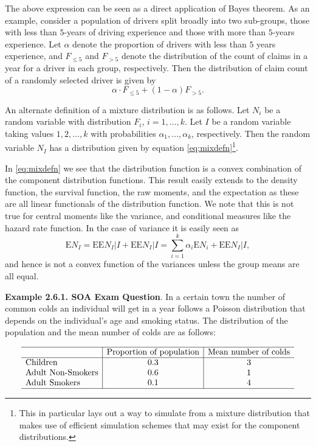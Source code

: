 \documentclass[]{book}
\let\rmarkdownfootnote\footnote%
\def\footnote{\protect\rmarkdownfootnote}
\theoremstyle{definition}
\theoremstyle{definition}
\theoremstyle{definition}
\theoremstyle{remark}
\begin{document}
The above expression can be seen as a direct application of Bayes
theorem. As an example, consider a population of drivers split broadly
into two sub-groups, those with less than \(5\)-years of driving
experience and those with more than \(5\)-years experience. Let
\(\alpha\) denote the proportion of drivers with less than \(5\) years
experience, and \(F_{\leq 5}\) and \(F_{> 5}\) denote the distribution
of the count of claims in a year for a driver in each group,
respectively. Then the distribution of claim count of a randomly
selected driver is given by \[
\alpha\cdot F_{\leq 5} + (1-\alpha)F_{> 5}.
\]

An alternate definition of a mixture distribution is as follows. Let
\(N_i\) be a random variable with distribution \(F_i\),
\(i=1,\ldots, k\). Let \(I\) be a random variable taking values
\(1,2,\ldots,k\) with probabilities \(\alpha_1,\ldots,\alpha_k\),
respectively. Then the random variable \(N_I\) has a distribution given
by equation \eqref{eq:mixdefn}\footnote{This in particular lays out a way
  to simulate from a mixture distribution that makes use of efficient
  simulation schemes that may exist for the component distributions.}.

In \eqref{eq:mixdefn} we see that the distribution function is a convex
combination of the component distribution functions. This result easily
extends to the density function, the survival function, the raw moments,
and the expectation as these are all linear functionals of the
distribution function. We note that this is not true for central moments
like the variance, and conditional measures like the hazard rate
function. In the case of variance it is easily seen as \[
\mathrm{E}{N_I}=\mathrm{E}{\mathrm{E}{N_I\vert I}} + \mathrm{E}{\mathrm{E}{N_I|I}}=\sum_{i=1}^k \alpha_i \mathrm{E}{N_i} + \mathrm{E}{\mathrm{E}{N_I|I}},
\] and hence is not a convex function of the variances unless the group
means are all equal.

\textbf{Example 2.6.1. SOA Exam Question}. In a certain town the number
of common colds an individual will get in a year follows a Poisson
distribution that depends on the individual's age and smoking status.
The distribution of the population and the mean number of colds are as
follows:

\[\begin{matrix}
\begin{array}{l|c|c}
\hline
 & \text{Proportion of population} &
\text{Mean number of colds}\\\hline
\text{Children} & 0.3 & 3\\
\text{Adult Non-Smokers} & 0.6 & 1\\
\text{Adult Smokers} & 0.1 & 4\\\hline
\end{array}
\end{matrix}\]
\end{document}
